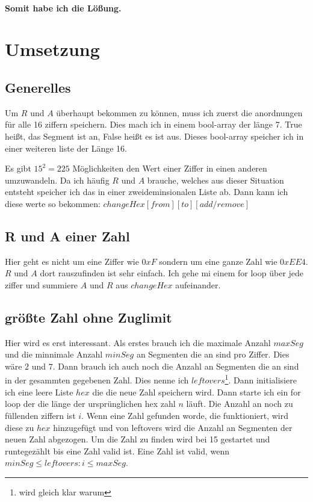 \documentclass[a4paper,10pt,ngerman]{scrartcl}
\begin{document}
\paragraph{Somit habe ich die Lößung.}

\section{Umsetzung}

\subsection{Generelles}

Um $R$ und $A$ überhaupt bekommen zu können, muss ich zuerst die anordnungen für alle 16 ziffern speichern. Dies mach ich in einem bool-array der länge 7. True heißt, das Segment ist an, False heißt es ist aus. Dieses bool-array speicher ich in einer weiteren liste der Länge 16.

Es gibt $15^2 = 225$ Möglichkeiten den Wert einer Ziffer in einen anderen umzuwandeln. Da ich häufig $R$ und $A$ brauche, welches aus dieser Situation entsteht speicher ich das in einer zweideminsionalen Liste ab. Dann kann ich diese werte so bekommen: $changeHex[from][to][add/remove]$

\subsection{R und A einer Zahl}

Hier geht es nicht um eine Ziffer wie $0xF$ sondern um eine ganze Zahl wie $0xEE4$. $R$ und $A$ dort rauszufinden ist sehr einfach. Ich gehe mi einem for loop über jede ziffer und summiere $A$ und $R$ aus $changeHex$ aufeinander.

\subsection{größte Zahl ohne Zuglimit}

Hier wird es erst interessant. Als erstes brauch ich die maximale Anzahl $maxSeg$ und die minnimale Anzahl $minSeg$ an Segmenten die an sind pro Ziffer. Dies wäre $2$ und $7$. Dann brauch ich auch noch die Anzahl an Segmenten die an sind in der gesammten gegebenen Zahl. Dies nenne ich $leftovers$\footnote{wird gleich klar warum}. Dann initialisiere ich eine leere Liste $hex$ die die neue Zahl speichern wird. Dann starte ich ein for loop der die länge der ursprünglichen hex zahl $n$ läuft. Die Anzahl an noch zu füllenden ziffern ist $i$. Wenn eine Zahl gefunden worde, die funktioniert, wird diese zu $hex$ hinzugefügt und von leftovers wird die Anzahl an Segmenten der neuen Zahl abgezogen. Um die Zahl zu finden wird bei 15 gestartet und runtegezählt bis eine Zahl valid ist. Eine Zahl ist valid, wenn $minSeg \leq leftovers : i \leq maxSeg$.
\end{document}
